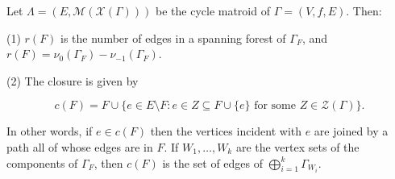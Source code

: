 Let $\Lambda = (E, \mathcal{M}(\mathcal{X}(\Gamma)))$ be the cycle matroid of $\Gamma = (V, f, E)$. Then:

(1) $r(F)$ is the number of edges in a spanning forest of $\Gamma_F$, and $r(F) = \nu_0(\Gamma_F) - \nu_{-1}(\Gamma_F)$.

(2) The closure is given by

$$c(F) = F \cup \{e \in E \setminus F : e \in Z \subseteq F \cup \{e\} \text{ for some } Z \in \mathcal{Z}(\Gamma)\}.$$

In other words, if $e \in c(F)$ then the vertices incident with $e$ are joined by a path all of whose edges are in $F$. If $W_1, \ldots, W_k$ are the vertex sets of the components of $\Gamma_F$, then $c(F)$ is the set of edges of $\bigoplus_{i=1}^{k} \Gamma_{W_i}$.
